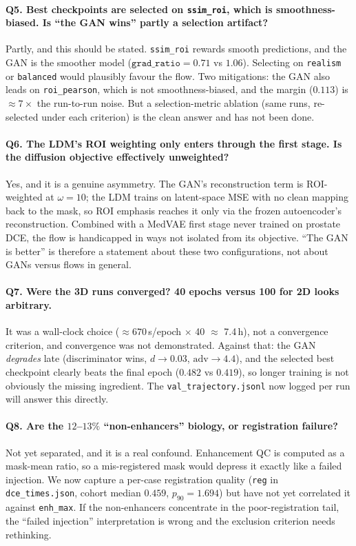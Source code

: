 \documentclass[11pt]{article}
\newcommand{\1}{\mathbb{1}}
\begin{document}
\paragraph{Q5. Best checkpoints are selected on \texttt{ssim\_roi}, which is smoothness-biased.
Is ``the GAN wins'' partly a selection artifact?}
Partly, and this should be stated. \texttt{ssim\_roi} rewards smooth predictions, and the GAN
is the smoother model ($\texttt{grad\_ratio}=0.71$ vs $1.06$). Selecting on
\texttt{realism} or \texttt{balanced} would plausibly favour the flow. Two mitigations: the
GAN also leads on \texttt{roi\_pearson}, which is not smoothness-biased, and the margin
($0.113$) is $\approx7\times$ the run-to-run noise. But a selection-metric ablation
(same runs, re-selected under each criterion) is the clean answer and has not been done.

\paragraph{Q6. The LDM's ROI weighting only enters through the first stage. Is the diffusion
objective effectively unweighted?}
Yes, and it is a genuine asymmetry. The GAN's reconstruction term is ROI-weighted at
$\omega=10$; the LDM trains on latent-space MSE with no clean mapping back to the mask, so
ROI emphasis reaches it only via the frozen autoencoder's reconstruction. Combined with a
MedVAE first stage never trained on prostate DCE, the flow is handicapped in ways not
isolated from its objective. ``The GAN is better'' is therefore a statement about these two
configurations, not about GANs versus flows in general.

\paragraph{Q7. Were the 3D runs converged? 40 epochs versus 100 for 2D looks arbitrary.}
It was a wall-clock choice ($\approx670$\,s/epoch $\times$ 40 $\approx$ 7.4\,h), not a
convergence criterion, and convergence was not demonstrated. Against that: the GAN
\emph{degrades} late (discriminator wins, $d\to0.03$, $\mathrm{adv}\to4.4$), and the selected
best checkpoint clearly beats the final epoch ($0.482$ vs $0.419$), so longer training is not
obviously the missing ingredient. The \texttt{val\_trajectory.jsonl} now logged per run will
answer this directly.

\paragraph{Q8. Are the $12$--$13\%$ ``non-enhancers'' biology, or registration failure?}
Not yet separated, and it is a real confound. Enhancement QC is computed as a mask-mean ratio,
so a mis-registered mask would depress it exactly like a failed injection. We now capture a
per-case registration quality (\texttt{reg} in \texttt{dce\_times.json}, cohort median $0.459$,
$p_{90}=1.694$) but have not yet correlated it against \texttt{enh\_max}. If the
non-enhancers concentrate in the poor-registration tail, the ``failed injection'' interpretation
is wrong and the exclusion criterion needs rethinking.
\end{document}
